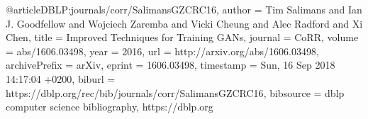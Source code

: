 @article{DBLP:journals/corr/SalimansGZCRC16,
  author    = {Tim Salimans and
               Ian J. Goodfellow and
               Wojciech Zaremba and
               Vicki Cheung and
               Alec Radford and
               Xi Chen},
  title     = {Improved Techniques for Training GANs},
  journal   = {CoRR},
  volume    = {abs/1606.03498},
  year      = {2016},
  url       = {http://arxiv.org/abs/1606.03498},
  archivePrefix = {arXiv},
  eprint    = {1606.03498},
  timestamp = {Sun, 16 Sep 2018 14:17:04 +0200},
  biburl    = {https://dblp.org/rec/bib/journals/corr/SalimansGZCRC16},
  bibsource = {dblp computer science bibliography, https://dblp.org}
}